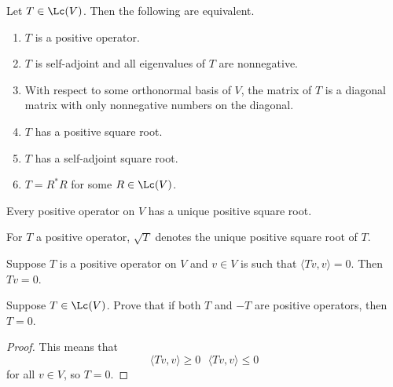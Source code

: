 \documentclass{extarticle}
\begin{document}
\begin{thm}
    Let \(T \in \Lc(V)\). Then the following are equivalent.
    \begin{enumerate}[label=(\alph*)]
        \item \(T\) is a positive operator.
        \item \(T\) is self-adjoint and all eigenvalues of \(T\) are nonnegative.
        \item With respect to some orthonormal basis of \(V\), the matrix of \(T\) is a diagonal
        matrix with only nonnegative numbers on the diagonal.
        \item \(T\) has a positive square root.
        \item \(T\) has a self-adjoint square root.
        \item \(T = R^* R\) for some \(R \in \Lc(V)\).
    \end{enumerate}
\end{thm}

\begin{thm}
    Every positive operator on \(V\) has a unique positive square root.
\end{thm}

\begin{remark}
    For \(T\) a positive operator, \(\sqrt{T}\) denotes the unique positive square root of \(T\).
\end{remark}

\begin{corollary}
    Suppose \(T\) is a positive operator on \(V\) and \(v \in V\) is such that \(\langle Tv,v \rangle = 0\).
    Then \(Tv = 0\).
\end{corollary}


\newpage
{}

\begin{problem}{1}
    Suppose \(T \in \Lc(V)\). Prove that if both \(T\) and \(-T\) are positive operators, then
    \(T = 0\).
\end{problem}

\begin{proof}
This means that
\[\langle Tv,v \rangle \geq 0 \ \ \ \langle Tv,v \rangle \leq 0\]
for all \(v \in V\), so \(T = 0\).
\end{proof}
\end{document}
